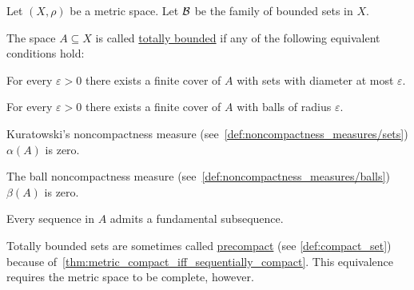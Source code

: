 Let $(X, \rho)$ be a metric space. Let $\mathcal{B}$ be the family of bounded sets in $X$.

\begin{definition}\label{def:totally_bounded_set}
  The space $A \subseteq X$ is called \uline{totally bounded} if any of the following equivalent conditions hold:

  \begin{defenum}
    \item\label{def:totally_bounded_set/sets} For every $\varepsilon > 0$ there exists a finite cover of $A$ with sets with diameter at most $\varepsilon$.
    \item\label{def:totally_bounded_set/balls} For every $\varepsilon > 0$ there exists a finite cover of $A$ with balls of radius $\varepsilon$.
    \item\label{def:totally_bounded_set/zero_noncompactness/sets} Kuratowski's noncompactness measure (see~\cref{def:noncompactness_measures/sets}) $\alpha(A)$ is zero.
    \item\label{def:totally_bounded_set/zero_noncompactness/balls} The ball noncompactness measure (see~\cref{def:noncompactness_measures/balls}) $\beta(A)$ is zero.
    \item\label{def:totally_bounded_set/fundamental_subsequences} Every sequence in $A$ admits a fundamental subsequence.
  \end{defenum}

  Totally bounded sets are sometimes called \uline{precompact} (see \cref{def:compact_set}) because of~\cref{thm:metric_compact_iff_sequentially_compact}. This equivalence requires the metric space to be complete, however.
\end{definition}
